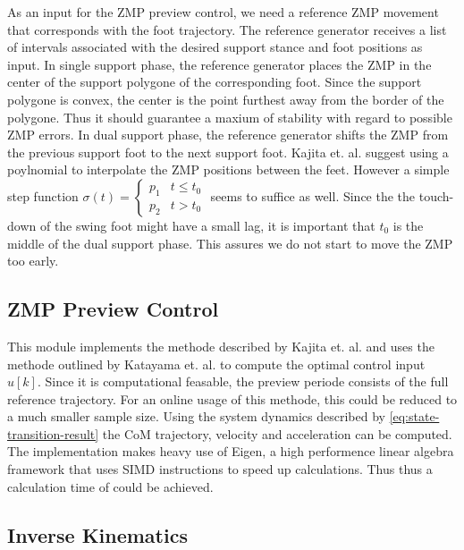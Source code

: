 \documentclass[english,ngerman]{KITreprt}
\newcommand{\clr}[2]{{\color{#1}{#2}}}
\newcommand{\todo}[1]{\marginpar{\clr{red}{#1}}}
\newcommand{\fixme}[1]{{\color{red}{FIXME: #1}}}
\begin{document}
As an input for the ZMP preview control, we need a reference ZMP
movement that corresponds with the foot trajectory. The reference
generator receives a list of intervals associated with the desired
support stance and foot positions as input. In single support phase, the
reference generator places the ZMP in the center of the support polygone
of the corresponding foot. Since the support polygone is convex, the
center is the point furthest away from the border of the polygone. Thus
it should guarantee a maxium of stability with regard to possible ZMP
errors. In dual support phase, the reference generator shifts the ZMP
from the previous support foot to the next support foot. Kajita et. al.
suggest using a poylnomial to interpolate the ZMP positions between the
feet. However a simple step function
$\sigma(t) = \left\{\begin{array}{lr}p_1 & t \leq t_0 \\ p_2 & t > t_0 \end{array}\right.$
seems to suffice as well. Since the the touch-down of the swing foot
might have a small lag, it is important that $t_0$ is the middle of the
dual support phase. This assures we do not start to move the ZMP too
early.

\subsection{ZMP Preview Control}\label{zmp-preview-control}

This module implements the methode described by Kajita et. al. and uses
the methode outlined by Katayama et. al. to compute the optimal control
input $u[k]$. Since it is computational feasable, the preview periode
consists of the full reference trajectory. For an online usage of this
methode, this could be reduced to a much smaller sample size.
\todo{Add timings, implement configurable preview periode} Using the
system dynamics described by \ref{eq:state-transition-result} the CoM
trajectory, velocity and acceleration can be computed. The
implementation makes heavy use of Eigen, a high performence linear
algebra framework that uses SIMD instructions to speed up calculations.
Thus thus a calculation time of \fixme{calculation time} could be
achieved.

\subsection{Inverse Kinematics}\label{inverse-kinematics}
\end{document}
